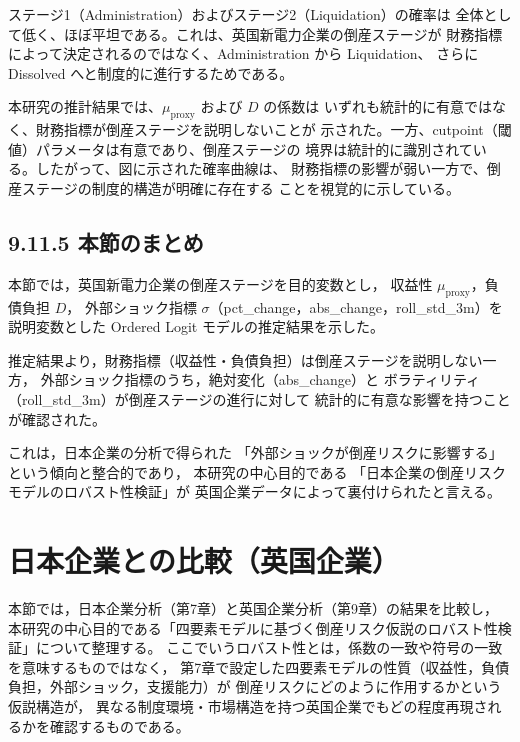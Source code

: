 ステージ1（Administration）およびステージ2（Liquidation）の確率は
全体として低く、ほぼ平坦である。これは、英国新電力企業の倒産ステージが
財務指標によって決定されるのではなく、Administration から Liquidation、
さらに Dissolved へと制度的に進行するためである。

本研究の推計結果では、$\mu_{\text{proxy}}$ および $D$ の係数は
いずれも統計的に有意ではなく、財務指標が倒産ステージを説明しないことが
示された。一方、cutpoint（閾値）パラメータは有意であり、倒産ステージの
境界は統計的に識別されている。したがって、図に示された確率曲線は、
財務指標の影響が弱い一方で、倒産ステージの制度的構造が明確に存在する
ことを視覚的に示している。


\subsection*{9.11.5 本節のまとめ}

本節では，英国新電力企業の倒産ステージを目的変数とし，
収益性 $\mu_{\text{proxy}}$，負債負担 $D$，
外部ショック指標 $\sigma$（pct\_change，abs\_change，roll\_std\_3m）を説明変数とした
Ordered Logit モデルの推定結果を示した。

推定結果より，財務指標（収益性・負債負担）は倒産ステージを説明しない一方，
外部ショック指標のうち，絶対変化（abs\_change）と
ボラティリティ（roll\_std\_3m）が倒産ステージの進行に対して
統計的に有意な影響を持つことが確認された。

これは，日本企業の分析で得られた
「外部ショックが倒産リスクに影響する」という傾向と整合的であり，
本研究の中心目的である
「日本企業の倒産リスクモデルのロバスト性検証」が
英国企業データによって裏付けられたと言える。


\section{日本企業との比較（英国企業）}

本節では，日本企業分析（第7章）と英国企業分析（第9章）の結果を比較し，
本研究の中心目的である「四要素モデルに基づく倒産リスク仮説のロバスト性検証」について整理する。
ここでいうロバスト性とは，係数の一致や符号の一致を意味するものではなく，
第7章で設定した四要素モデルの性質（収益性，負債負担，外部ショック，支援能力）が
倒産リスクにどのように作用するかという仮説構造が，
異なる制度環境・市場構造を持つ英国企業でもどの程度再現されるかを確認するものである。


